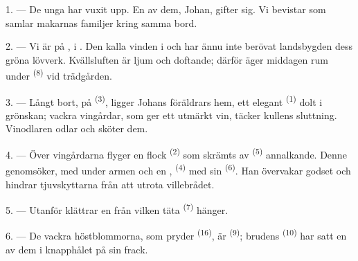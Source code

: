 
\VUsaut{4.0mm}
\VUsaut{1.6mm}
\VUsaut{3.2mm}

\VUsaut{1.6mm}
\VUsaut{2.6mm}

\VUsaut{3.0mm}

1. --- De unga har vuxit upp. En av dem, Johan, gifter sig. Vi bevistar
 som samlar makarnas familjer kring samma bord.

2. --- Vi är på , i . Den kalla vinden i
 och  har ännu inte berövat landsbygden dess
gröna lövverk. Kvällsluften är ljum och doftande; därför äger middagen rum under
 \textsuperscript{(8)} vid trädgården.

3. --- Långt bort, på  \textsuperscript{(3)}, ligger Johans föräldrars hem, ett
elegant  \textsuperscript{(1)} dolt i grönskan; vackra vingårdar, som ger ett
utmärkt vin, täcker kullens sluttning. Vinodlaren odlar och sköter dem.

4. --- Över vingårdarna flyger en flock  \textsuperscript{(2)} som skrämts av
 \textsuperscript{(5)} annalkande. Denne genomsöker, med
 under armen och en , 
\textsuperscript{(4)} med sin  \textsuperscript{(6)}. Han övervakar godset och
hindrar tjuvskyttarna från att utrota villebrådet.

5. --- Utanför  klättrar en  från vilken täta
 \textsuperscript{(7)} hänger.

6. --- De vackra höstblommorna, som pryder  \textsuperscript{(16)}, är
 \textsuperscript{(9)}; brudens
 \textsuperscript{(10)} har satt en av dem i knapphålet på sin frack.

